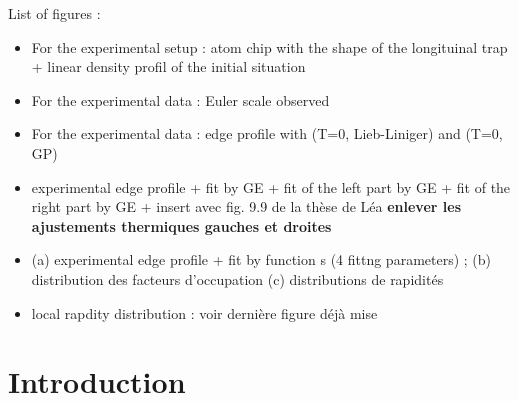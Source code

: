 \documentclass[submission, Phys]{SciPost}
\begin{document}
List of figures  : 
\begin{itemize}
    \item For the experimental setup : atom chip with the shape of the longituinal trap + linear density profil of the initial situation
    \item For the experimental data : Euler scale observed
    \item For the experimental data : edge profile with (T=0, Lieb-Liniger) and (T=0, GP) 
    \item experimental edge profile + fit by GE + fit of the left part by GE + fit of the right part by GE + insert avec fig. 9.9 de la thèse de Léa \textbf{enlever les ajustements thermiques gauches et droites}
    \item (a) experimental edge profile + fit by  function s (4 fittng parameters) ; (b) distribution des facteurs d'occupation (c) distributions de rapidités
    \item  local rapdity distribution : voir dernière figure déjà mise 
\end{itemize}

\section{Introduction} 
\label{sec:intro}
\end{document}
